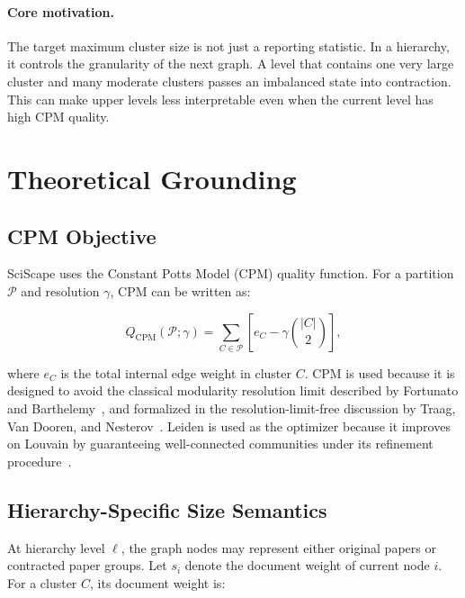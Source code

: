 \documentclass[11pt,a4paper]{article}
\begin{document}
\paragraph{Core motivation.}
The target maximum cluster size is not just a reporting statistic. In a
hierarchy, it controls the granularity of the next graph. A level that contains
one very large cluster and many moderate clusters passes an imbalanced
state into contraction. This can make upper levels less interpretable even
when the current level has high CPM quality.

\section{Theoretical Grounding}

\subsection{CPM Objective}

SciScape uses the Constant Potts Model (CPM) quality function. For a partition
$\mathcal{P}$ and resolution $\gamma$, CPM can be written as:

\begin{equation}
    Q_{\text{CPM}}(\mathcal{P}; \gamma)
    =
    \sum_{C \in \mathcal{P}}
    \left[
        e_C - \gamma \binom{|C|}{2}
    \right],
\end{equation}

where $e_C$ is the total internal edge weight in cluster $C$. CPM is used
because it is designed to avoid the classical modularity resolution limit
described by Fortunato and Barthelemy~\cite{fortunato2007resolution}, and
formalized in the resolution-limit-free discussion by Traag, Van Dooren, and
Nesterov~\cite{traag2011narrow}. Leiden is used as the optimizer because it
improves on Louvain by guaranteeing well-connected communities under its
refinement procedure~\cite{traag2019leiden}.

\subsection{Hierarchy-Specific Size Semantics}

At hierarchy level $\ell$, the graph nodes may represent either original papers
or contracted paper groups. Let $s_i$ denote the document weight of current
node $i$. For a cluster $C$, its document weight is:
\end{document}
